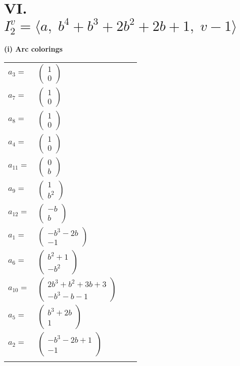 \documentclass[1p]{elsarticle_modified}
\theoremstyle{definition}
\begin{document}
\centering \section*{VI. $I^v_{2}= \langle a,\;b^4+b^3+2 b^2+2 b+1,\;v-1 \rangle$}
\flushleft \textbf{(i) Arc colorings}\\
\begin{tabular}{m{7pt} m{180pt} m{7pt} m{180pt} }
\flushright $a_{3}=$&$\begin{pmatrix}1\\0\end{pmatrix}$ \\
\flushright $a_{7}=$&$\begin{pmatrix}1\\0\end{pmatrix}$ \\
\flushright $a_{8}=$&$\begin{pmatrix}1\\0\end{pmatrix}$ \\
\flushright $a_{4}=$&$\begin{pmatrix}1\\0\end{pmatrix}$ \\
\flushright $a_{11}=$&$\begin{pmatrix}0\\b\end{pmatrix}$ \\
\flushright $a_{9}=$&$\begin{pmatrix}1\\b^2\end{pmatrix}$ \\
\flushright $a_{12}=$&$\begin{pmatrix}- b\\b\end{pmatrix}$ \\
\flushright $a_{1}=$&$\begin{pmatrix}- b^3-2 b\\-1\end{pmatrix}$ \\
\flushright $a_{6}=$&$\begin{pmatrix}b^2+1\\- b^2\end{pmatrix}$ \\
\flushright $a_{10}=$&$\begin{pmatrix}2 b^3+b^2+3 b+3\\- b^3- b-1\end{pmatrix}$ \\
\flushright $a_{5}=$&$\begin{pmatrix}b^3+2 b\\1\end{pmatrix}$ \\
\flushright $a_{2}=$&$\begin{pmatrix}- b^3-2 b+1\\-1\end{pmatrix}$\\&\end{tabular}
\end{document}

